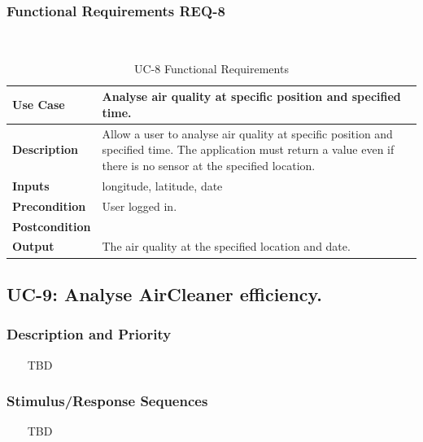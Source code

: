 \documentclass{report}
\begin{document}
\subsubsection*{Functional Requirements REQ-8} ~~~
\begin{table}[H]
	\begin{center}
		\begin{tabular}{|m{4cm}|m{10cm}|}
		\hline
		\textbf{Use Case} & Analyse air quality at specific position and specified time. \\
		\hline
		\textbf{Description} & Allow a user to analyse air quality at specific position and specified time. The application must return a value even if there is no sensor at the specified location. \\
		\hline
		\textbf{Inputs} &  longitude, latitude, date\\
		\hline
		\textbf{Precondition} & User logged in. \\
		\hline
		\textbf{Postcondition} &  \\
		\hline
		\textbf{Output} & The air quality at the specified location and date. \\
		\hline
		\end{tabular}
	\end{center}
	\caption{UC-8 Functional Requirements}
	\label{table:REQ-8}
\end{table}


\subsection{UC-9: Analyse AirCleaner efficiency.}

\subsubsection*{Description and Priority} ~~~
TBD

\subsubsection*{Stimulus/Response Sequences} ~~~
TBD
\end{document}
